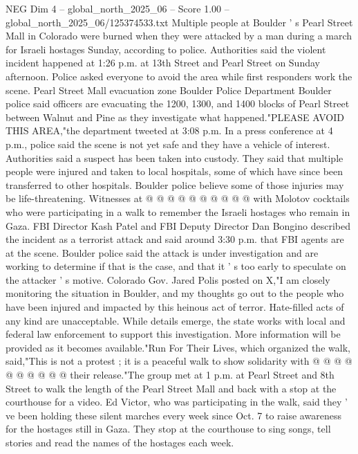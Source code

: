 \begin{textsample}{NEG Dim 4 – global\_north\_2025\_06 – Score 1.00 – global\_north\_2025\_06/125374533.txt}  \label{ex:f4_neg_068}
Multiple people at Boulder ' s Pearl Street Mall in Colorado were burned when they were attacked by a man during a march for Israeli hostages Sunday, according to police.
Authorities said the violent incident happened at 1:26 p.m. at 13th Street and Pearl Street on Sunday afternoon.
Police asked everyone to avoid the area while first responders work the scene.
Pearl Street Mall evacuation zone Boulder Police Department Boulder police said officers are evacuating the 1200, 1300, and 1400 blocks of Pearl Street between Walnut and Pine as they investigate what happened."PLEASE AVOID THIS AREA,"the department tweeted at 3:08 p.m.
In a press conference at 4 p.m., police said the scene is not yet safe and they have a vehicle of interest.
Authorities said a suspect has been taken into custody.
They said that multiple people were injured and taken to local hospitals, some of which have since been transferred to other hospitals.
Boulder police believe some of those injuries may be life-threatening.
Witnesses at @ @ @ @ @ @ @ @ @ @ with Molotov cocktails who were participating in a walk to remember the Israeli hostages who remain in Gaza.
FBI Director Kash Patel and FBI Deputy Director Dan Bongino described the incident as a terrorist attack and said around 3:30 p.m. that FBI agents are at the scene.
Boulder police said the attack is under investigation and are working to determine if that is the case, and that it ' s too early to speculate on the attacker ' s motive.
Colorado Gov.
Jared Polis posted on X,"I am closely monitoring the situation in Boulder, and my thoughts go out to the people who have been injured and impacted by this heinous act of terror.
Hate-filled acts of any kind are unacceptable.
While details emerge, the state works with local and federal law enforcement to support this investigation.
More information will be provided as it becomes available."Run For Their Lives, which organized the walk, said,"This is not a protest ; it is a peaceful walk to show solidarity with @ @ @ @ @ @ @ @ @ @ their release."The group met at 1 p.m. at Pearl Street and 8th Street to walk the length of the Pearl Street Mall and back with a stop at the courthouse for a video.
Ed Victor, who was participating in the walk, said they ' ve been holding these silent marches every week since Oct. 7 to raise awareness for the hostages still in Gaza.
They stop at the courthouse to sing songs, tell stories and read the names of the hostages each week.

\end{textsample}
